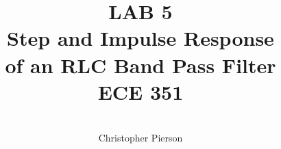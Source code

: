 



\documentclass[12pt]{article}

\usepackage[english]{babel}
\usepackage[utf8x]{inputenc}
\usepackage[T1]{fontenc}
\usepackage{graphicx}
\usepackage{amsmath}
\usepackage{caption}
\usepackage{float}
\usepackage{caption}
\usepackage{subcaption}
\usepackage{rotating}
\usepackage{setspace}

\usepackage[a4paper,top=3cm,bottom=2cm,left=3cm,right=3cm,marginparwidth=1.75cm]{geometry}

\usepackage[colorinlistoftodos]{todonotes}
\usepackage[colorlinks=true, allcolors=blue]{hyperref}
\usepackage{listings}
\usepackage{gensymb}



\title{%
	\textbf{LAB 5} \\
	Step and Impulse Response \\of an RLC Band Pass Filter \\
	 ECE 351 }

\author{\\
	Christopher Pierson}

	
	
\vspace{\fill}
\maketitle
\vspace{\fill}
\clearpage

